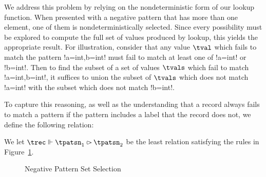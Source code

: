 \documentclass[nocopyright]{sigplanconf}
\begin{document}
We address this problem by relying on the nondeterministic form of our lookup function.  When presented with a negative pattern that has more than one element, one of them is nondeterministically selected.  Since every possibility must be explored to compute the full set of values produced by lookup, this yields the appropriate result.  For illustration, consider that any value $\tval$ which fails to match the pattern \plangil!{a=int,b=int}! must fail to match at least one of \plangil!{a=int}! or \plangil!{b=int}!.  Then to find the subset of a set of values $\tvals$ which fail to match \plangil!{a=int,b=int}!, it suffices to union the subset of $\tvals$ which does not match \plangil!{a=int}! with the subset which does not match \plangil!{b=int}!.

To capture this reasoning, as well as the understanding that a record always fails to match a pattern if the pattern includes a label that the record does not, we define the following relation:

\begin{definition}
    We let $\negativePatternSelectCase{\trec}{\tpatsn_1}{\tpatsn_2}$ be the least relation satisfying the rules in Figure~\ref{fig_selectCase}.
\end{definition}

\begin{figure}
    \begin{mathpar}



    \end{mathpar}
    \caption{Negative Pattern Set Selection}
    \label{fig_selectCase}
\end{figure}
\end{document}
